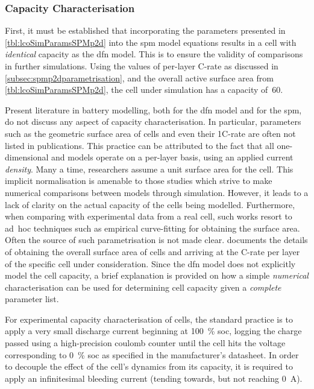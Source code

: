 \subsubsection*{Capacity Characterisation}\label{subsubsec:capcharspmp2d}

First, it  must be  established that incorporating  the parameters  presented in
\cref{tbl:lcoSimParamsSPMp2d} into  the \gls{spm}  model equations results  in a
cell with  \emph{identical} capacity as the  \gls{dfn} model. This is  to ensure
the  validity  of  comparisons  in  further simulations.  Using  the  values  of
per-layer C-rate  as discussed  in \cref{subsec:spmp2dparametrisation},  and the
overall active  surface area from \cref{tbl:lcoSimParamsSPMp2d},  the cell under
simulation has a capacity of~\SI{60}{\amphour}.

Present literature  in battery modelling, both  for the \gls{dfn} model  and for
the  \gls{spm}, do  not  discuss  any aspect  of  capacity characterisation.  In
particular,  parameters  such  as  the  geometric  surface  area  of  cells  and
even  their 1C-rate  are often  not listed  in publications.  This practice  can
be  attributed  to  the  fact  that  all  one-dimensional  and  
models operate  on a per-layer  basis, using an applied  current \emph{density}.
Many  a  time,  researchers assume  a  unit  surface  area  for the  cell.  This
implicit  normalisation  is amenable  to  those  studies  which strive  to  make
numerical comparisons  between models through  simulation. However, it  leads to
a  lack  of  clarity  on  the  actual capacity  of  the  cells  being  modelled.
Furthermore, when comparing with experimental data  from a real cell, such works
resort to  \mbox{ad hoc} techniques such  as empirical curve-fitting for  obtaining the
surface  area. Often  the  source of  such parametrisation  is  not made  clear.
  documents  the  details of  obtaining  the  overall
surface area  of cells  and arriving  at the  C-rate per  layer of  the specific
cell  under  consideration.  Since  the  \gls{dfn}  model  does  not  explicitly
model  the cell  capacity,  a brief  explanation  is provided  on  how a  simple
\emph{numerical}  characterisation can  be  used for  determining cell  capacity
given a \emph{complete} parameter list.


For experimental capacity characterisation of cells, the standard practice is to
apply a very small discharge  current beginning at \SI{100}{\percent} \gls{soc},
logging the charge passed using a  high-precision coulomb counter until the cell
hits the voltage corresponding to \SI{0}{\percent} \gls{soc} as specified in the
manufacturer's datasheet. In order to decouple the effect of the cell's dynamics
from its  capacity, it is  required to  apply an infinitesimal  bleeding current
(tending towards, but not reaching \SI{0}{\ampere}).

